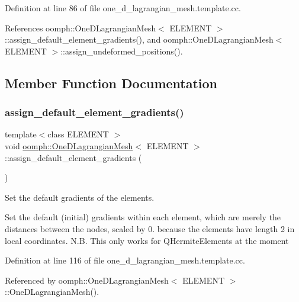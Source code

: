 Definition at line 86 of file one\+\_\+d\+\_\+lagrangian\+\_\+mesh.\+template.\+cc.



References oomph\+::\+One\+D\+Lagrangian\+Mesh$<$ E\+L\+E\+M\+E\+N\+T $>$\+::assign\+\_\+default\+\_\+element\+\_\+gradients(), and oomph\+::\+One\+D\+Lagrangian\+Mesh$<$ E\+L\+E\+M\+E\+N\+T $>$\+::assign\+\_\+undeformed\+\_\+positions().



\subsection{Member Function Documentation}
\mbox{\label{classoomph_1_1OneDLagrangianMesh_a7a4eabf4901a90b3015d2620fc70f648}} 
\subsubsection{\texorpdfstring{assign\+\_\+default\+\_\+element\+\_\+gradients()}{assign\_default\_element\_gradients()}}
{\footnotesize\ttfamily template$<$class E\+L\+E\+M\+E\+NT $>$ \\
void \hyperlink{classoomph_1_1OneDLagrangianMesh}{oomph\+::\+One\+D\+Lagrangian\+Mesh}$<$ E\+L\+E\+M\+E\+NT $>$\+::assign\+\_\+default\+\_\+element\+\_\+gradients (\begin{DoxyParamCaption}{ }\end{DoxyParamCaption})\hspace{0.3cm}{\ttfamily [private]}}



Set the default gradients of the elements. 

Set the default (initial) gradients within each element, which are merely the distances between the nodes, scaled by 0. because the elements have length 2 in local coordinates. N.\+B. This only works for Q\+Hermite\+Elements at the moment 

Definition at line 116 of file one\+\_\+d\+\_\+lagrangian\+\_\+mesh.\+template.\+cc.



Referenced by oomph\+::\+One\+D\+Lagrangian\+Mesh$<$ E\+L\+E\+M\+E\+N\+T $>$\+::\+One\+D\+Lagrangian\+Mesh().

